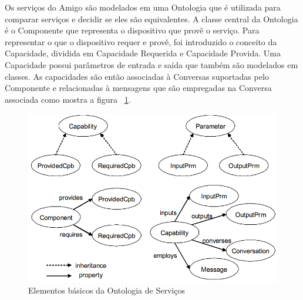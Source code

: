 Os serviços do Amigo são modelados em uma Ontologia que é utilizada para comparar serviços e decidir se eles são equivalentes. A classe central da Ontologia é o Componente que representa o dispositivo que provê o serviço. Para representar o que o dispositivo requer e provê, foi introduzido o conceito da Capacidade, dividida em Capacidade Requerida e Capacidade Provida. Uma Capacidade possui parâmetros de entrada e saída que também são modelados em classes. As capacidades são então associadas à Conversas suportadas pelo Componente e relacionadas à mensagens que são empregadas na Conversa associada como mostra a figura ~\ref{fig:amigoServiceOntology}.

\begin{figure}[ht]
\center
\includegraphics[scale=0.5]{imagens/amigo-ontology}
\caption{Elementos básicos da Ontologia de Serviços~\cite{amigoCore}}
\label{fig:amigoServiceOntology}
\end{figure}

